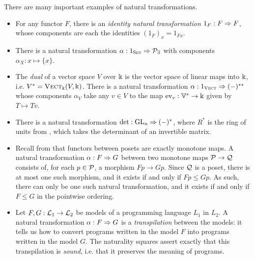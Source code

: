 \begin{ex}
  There are many important examples of natural transformations.
  \begin{itemize}
    \item For any functor $F$, there is an \emph{identity natural transformation
      $1_F: F\Rightarrow F$}, whose components are each the identities $(1_F)_x = 1_{Fx}$.
    \item There is a natural transformation $\alpha: 1_{\textsc{\text{Set}}}\Rightarrow
      \mathcal{P}_\exists$ with components $\alpha_X: x\mapsto \{x\}$.
    \item The \emph{dual} of a vector space $V$ over $\Bbbk$ is the vector space
      of linear maps into $\Bbbk$, i.e. $V^* = {\textsc{\text{Vect}}}_\Bbbk(V, \Bbbk)$. There is
      a natural transformation $\alpha: 1_{{\textsc{\text{Vect}}}}\Rightarrow (-)^{**}$ whose
      components $\alpha_V$ take any $v\in V$ to the map $\text{ev}_v:
      \mathbb{V}^*\to\Bbbk$ given by $T\mapsto Tv$.
    \item There is a natural transformation $\det:\text{GL}_n\Rightarrow (-)^*$, where
      $R^*$ is the ring of units from , which
      takes the determinant of an invertible matrix.
    \item Recall from  that functors between posets
      are exactly monotone maps. A natural transformation $\alpha: F\Rightarrow G$
      between two monotone maps $\mathcal{P}\to\mathcal{Q}$ consists of, for each $p\in\mathcal{P}$, a
      morphism $Fp\to Gp$. Since $\mathcal{Q}$ is a poset, there is at most one such
      morphism, and it exists if and only if $Fp\leq Gp$. As such, there can
      only be one such natural transformation, and it exists if and only if
      $F\leq G$ in the pointwise ordering.
    \item Let $F,G:\mathcal{L}_1\to\mathcal{L}_2$ be models of a programming language $L_1$ in
      $L_2$. A natural transformation $\alpha: F\Rightarrow G$ is a \emph{transpilation}
      between the models: it tells us how to convert programs written in the
      model $F$ into programs written in the model $G$. The naturality squares
      assert exactly that this transpilation is \emph{sound}, i.e. that it
      preserves the meaning of programs.
 \end{itemize}
\end{ex}

